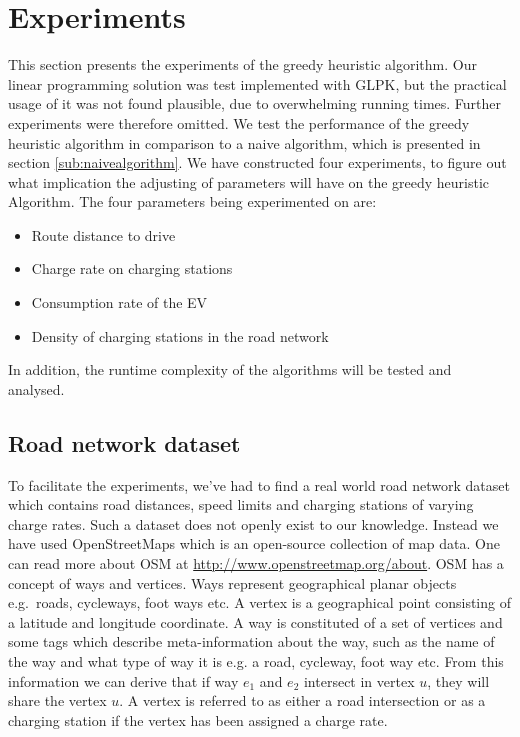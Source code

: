 \section{Experiments}
\label{sec:experiments}
This section presents the experiments of the greedy heuristic algorithm. Our linear programming solution was test implemented with GLPK, but the practical usage of it was not found plausible, due to overwhelming running times. Further experiments were therefore omitted. We test the performance of the greedy heuristic algorithm in comparison to a naive algorithm, which is presented in section \ref{sub:naivealgorithm}. We have constructed four experiments, to figure out what implication the adjusting of parameters will have on the greedy heuristic Algorithm. The four parameters being experimented on are:

\begin{itemize}
     \item Route distance to drive
     \item Charge rate on charging stations
     \item Consumption rate of the EV
     \item Density of charging stations in the road network
 \end{itemize} 

In addition, the runtime complexity of the algorithms will be tested and analysed.  

\subsection{Road network dataset} 
\label{sub:setup}
To facilitate the experiments, we've had to find a real world road network dataset which contains road distances, speed limits and charging stations of varying charge rates. Such a dataset does not openly exist to our knowledge. Instead we have used OpenStreetMaps which is an open-source collection of map data. One can read more about OSM at \url{http://www.openstreetmap.org/about}. OSM has a concept of ways and vertices. Ways represent geographical planar objects e.g.\ roads, cycleways, foot ways etc. A vertex is a geographical point consisting of a latitude and longitude coordinate. A way is constituted of a set of vertices and some tags which describe meta-information about the way, such as the name of the way and what type of way it is e.g. a road, cycleway, foot way  etc. From this information we can derive that if way $e_1$ and $e_2$ intersect in vertex $u$, they will share the vertex $u$. A vertex is referred to as either a road intersection or as a charging station if the vertex has been assigned a charge rate.


